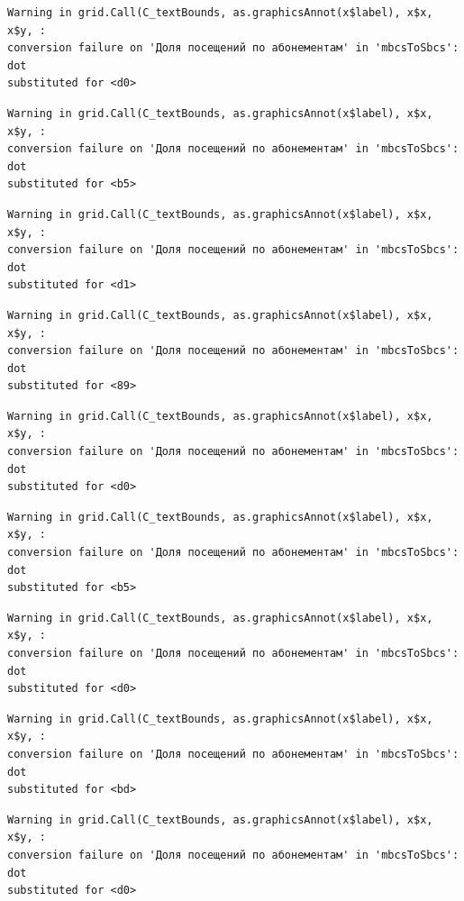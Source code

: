 \documentclass[
  letterpaper,
  DIV=11,
  numbers=noendperiod]{scrartcl}
\begin{document}
\begin{verbatim}
Warning in grid.Call(C_textBounds, as.graphicsAnnot(x$label), x$x, x$y, :
conversion failure on 'Доля посещений по абонементам' in 'mbcsToSbcs': dot
substituted for <d0>
\end{verbatim}

\begin{verbatim}
Warning in grid.Call(C_textBounds, as.graphicsAnnot(x$label), x$x, x$y, :
conversion failure on 'Доля посещений по абонементам' in 'mbcsToSbcs': dot
substituted for <b5>
\end{verbatim}

\begin{verbatim}
Warning in grid.Call(C_textBounds, as.graphicsAnnot(x$label), x$x, x$y, :
conversion failure on 'Доля посещений по абонементам' in 'mbcsToSbcs': dot
substituted for <d1>
\end{verbatim}

\begin{verbatim}
Warning in grid.Call(C_textBounds, as.graphicsAnnot(x$label), x$x, x$y, :
conversion failure on 'Доля посещений по абонементам' in 'mbcsToSbcs': dot
substituted for <89>
\end{verbatim}

\begin{verbatim}
Warning in grid.Call(C_textBounds, as.graphicsAnnot(x$label), x$x, x$y, :
conversion failure on 'Доля посещений по абонементам' in 'mbcsToSbcs': dot
substituted for <d0>
\end{verbatim}

\begin{verbatim}
Warning in grid.Call(C_textBounds, as.graphicsAnnot(x$label), x$x, x$y, :
conversion failure on 'Доля посещений по абонементам' in 'mbcsToSbcs': dot
substituted for <b5>
\end{verbatim}

\begin{verbatim}
Warning in grid.Call(C_textBounds, as.graphicsAnnot(x$label), x$x, x$y, :
conversion failure on 'Доля посещений по абонементам' in 'mbcsToSbcs': dot
substituted for <d0>
\end{verbatim}

\begin{verbatim}
Warning in grid.Call(C_textBounds, as.graphicsAnnot(x$label), x$x, x$y, :
conversion failure on 'Доля посещений по абонементам' in 'mbcsToSbcs': dot
substituted for <bd>
\end{verbatim}

\begin{verbatim}
Warning in grid.Call(C_textBounds, as.graphicsAnnot(x$label), x$x, x$y, :
conversion failure on 'Доля посещений по абонементам' in 'mbcsToSbcs': dot
substituted for <d0>
\end{verbatim}
\end{document}
